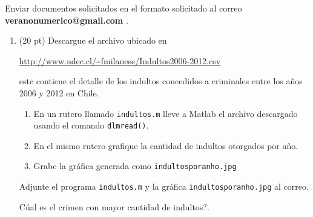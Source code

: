 \documentclass[11pt]{article}
\begin{document}
Enviar documentos solicitados en el formato solicitado al correo 
\textbf{veranonumerico@gmail.com} .
\begin{enumerate}
\item (20 pt) Descargue el archivo ubicado en 
\begin{center}
\url{http://www.udec.cl/~fmilanese/Indultos2006-2012.csv}
\end{center}
este contiene el detalle de los indultos concedidos a criminales entre los a\~nos 2006 y 2012 en Chile. 
\begin{enumerate}
	\item En un rutero llamado \texttt{indultos.m} lleve a Matlab el archivo descargado usando el comando \texttt{dlmread()}. 
    \item En el mismo rutero grafique la cantidad de indultos otorgados por a\~no.
    \item Grabe la gr\'afica generada como \texttt{indultosporanho.jpg}
\end{enumerate}
Adjunte el programa \texttt{indultos.m} y la gr\'afica \texttt{indultosporanho.jpg} al correo.

\textquestiondown C\'ual es el crimen con mayor cantidad de indultos?.





\end{enumerate}
\end{document}
